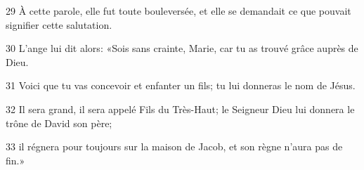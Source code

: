 
29 À cette parole, elle fut toute bouleversée, et elle se demandait ce que pouvait signifier cette salutation.

30 L’ange lui dit alors: «Sois sans crainte, Marie, car tu as trouvé grâce auprès de Dieu.

31 Voici que tu vas concevoir et enfanter un fils; tu lui donneras le nom de Jésus.

32 Il sera grand, il sera appelé Fils du Très-Haut; le Seigneur Dieu lui donnera le trône de David son père;

33 il régnera pour toujours sur la maison de Jacob, et son règne n’aura pas de fin.»
